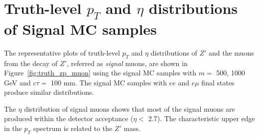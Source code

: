\section{Truth-level \texorpdfstring{$p_{T}$}{pt} and \texorpdfstring{$\eta$}{eta} distributions of Signal MC samples}
\label{app:signal_truth}

The representative plots of truth-level $p_{T}$ and $\eta$ distributions of $Z'$ and the muons from the decay of $Z'$, referred as \textit{signal} muons, are shown in Figure~\ref{fig:truth_zp_muon} using the signal MC samples with $m=$ 500, 1000 GeV and $c\tau=$ 100 mm. The signal MC samples with $ee$ and $e\mu$ final states produce similar distributions.

The $\eta$ distribution of signal muons shows that most of the signal muons are produced within the detector acceptance ($\eta <$ 2.7). The characteristic upper edge in the $p_{T}$ spectrum is related to the $Z'$ mass.


